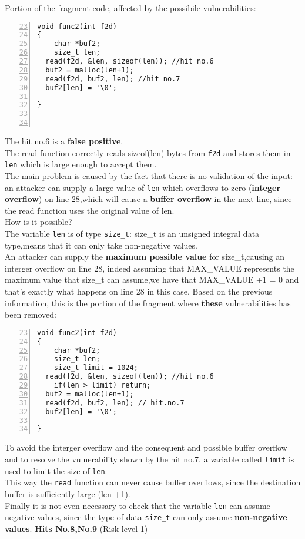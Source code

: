 \documentclass[a4paper,12pt]{article}
\begin{document}
\noindent
Portion of the fragment code, affected by the possibile vulnerabilities:
\begin{lstlisting}[style=c,numbers=left,firstnumber=23,linebackgroundcolor={
\ifnum\value{lstnumber}=27\color{green}\fi
\ifnum\value{lstnumber}=28\color{red}\fi
\ifnum\value{lstnumber}=29\color{red}\fi}]
void func2(int f2d)
{
	char *buf2;
	size_t len;
  read(f2d, &len, sizeof(len)); //hit no.6
  buf2 = malloc(len+1); 
  read(f2d, buf2, len); //hit no.7
  buf2[len] = '\0';

}



\end{lstlisting}
The hit no.6 is a \textbf{false positive}.\\
The read function correctly reads sizeof(len) bytes from \texttt{f2d} and stores them in \texttt{len} which is large enough to accept them.\\
The main problem is caused by the fact that there is no validation of the input: an attacker can supply a large value of \texttt{len} which 
overflows to zero (\textbf{integer overflow}) on line 28,which will cause a \textbf{buffer overflow} in the next line, since the read function uses the original value of len.\\
How is it possible?\\
The variable \texttt{len} is of type \texttt{size\_t}: size\_t is an unsigned integral data type,means that it can only take non-negative values.\\
An attacker can supply the \textbf{maximum possible value} for size\_t,causing an interger overflow on line 28, indeed assuming that MAX\_VALUE represents the maximum value that size\_t can assume,we have that MAX\_VALUE +1 = 0 and that's exactly what happens on line 28 in this case.
\newpage
\noindent
Based on the previous information, this is the portion of the fragment where \textbf{these} vulnerabilities has been removed:
\begin{lstlisting}[style=c,numbers=left,firstnumber=23,linebackgroundcolor={
\ifnum\value{lstnumber}=27\color{green}\fi
\ifnum\value{lstnumber}=28\color{green}\fi
\ifnum\value{lstnumber}=29\color{green}\fi
\ifnum\value{lstnumber}=31\color{green}\fi}]
void func2(int f2d)
{
	char *buf2;
	size_t len;
	size_t limit = 1024;
  read(f2d, &len, sizeof(len)); //hit no.6
	if(len > limit) return;   
  buf2 = malloc(len+1); 
  read(f2d, buf2, len); // hit.no.7
  buf2[len] = '\0';

}
\end{lstlisting}
To avoid the interger overflow and the consequent and possible buffer overflow and to resolve the vulnerability shown by the hit no.7, a variable called \texttt{limit} is used to limit the size of \texttt{len}.\\
This way the \texttt{read} function can never cause buffer overflows, since the destination buffer is sufficiently large (len +1).\\
Finally it is not even necessary to check that the variable \texttt{len} can assume negative values, since the type of data \texttt{size\_t} can only assume \textbf{non-negative values}.
\newpage
\textbf{Hits No.8,No.9} (Risk level 1)
\end{document}
